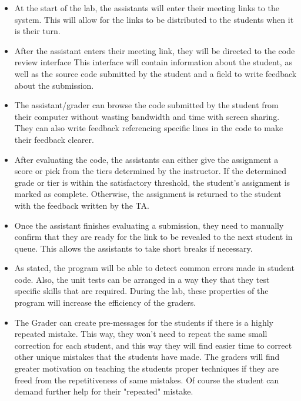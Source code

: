 \documentclass[a4paper, 12pt]{article}
\begin{document}
    \begin{itemize}
        \item At the start of the lab, the assistants will enter their meeting links to the system.
        This will allow for the links to be distributed to the students when it is their turn.
        \item After the assistant enters their meeting link, they will be directed to the code review interface
        This interface will contain information about the student, as well as the source code submitted by the student
        and a field to write feedback about the submission.
        \item The assistant/grader can browse the code submitted by the student from their computer without wasting bandwidth
        and time with screen sharing. They can also write feedback referencing specific lines in the code to make their
        feedback clearer.
        \item After evaluating the code, the assistants can either give the assignment a score or pick
          from the tiers determined by the instructor. If the determined grade or tier is within the satisfactory
          threshold, the student's assignment is marked as complete. Otherwise, the assignment is returned to the
          student with the feedback written by the TA.
        \item Once the assistant finishes evaluating a submission, they need to manually confirm that they are
          ready for the link to be revealed to the next student in queue. This allows the assistants to take short
          breaks if necessary.
        \item As stated, the program will be able to detect common errors made in student code. 
        Also, the unit tests can be arranged in a way they that they test specific skills that are
        required. During the lab, these properties of the program will increase the efficiency of the
        graders.
        \item The Grader can create pre-messages for the students if there is a highly repeated
        mistake. This way, they won't need to repeat the same small correction for each student,
        and this way they will find easier time to correct other unique mistakes that the students
        have made. The graders will find greater motivation on teaching the students proper techniques
        if they are freed from the repetitiveness of same mistakes. Of course the student can demand
        further help for their "repeated" mistake.
    \end{itemize}
    
\end{document}
